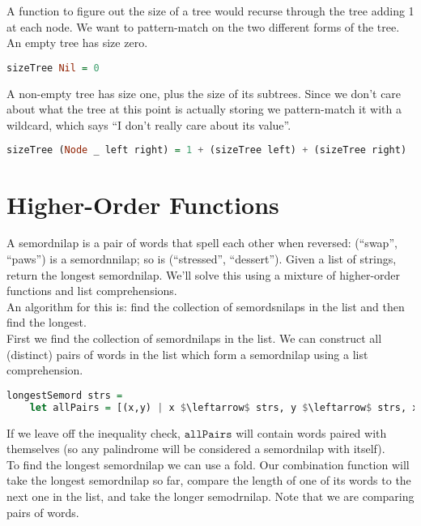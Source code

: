 \documentclass[a4paper,12pt]{article}
\newcommand{\kwa}[1]{\mathtt{#1}}
\begin{document}
\noindent
A function to figure out the size of a tree would recurse through the tree adding 1 at each node. We want to pattern-match on the two different forms of the tree. An empty tree has size zero.

\begin{lstlisting}[language=Haskell]
sizeTree Nil = 0
\end{lstlisting}

\noindent
A non-empty tree has size one, plus the size of its subtrees. Since we don't care about what the tree at this point is actually storing we pattern-match it with a wildcard, which says ``I don't really care about its value''.

\begin{lstlisting}[language=Haskell]
 sizeTree (Node _ left right) = 1 + (sizeTree left) + (sizeTree right)
\end{lstlisting}

\section{Higher-Order Functions}

\noindent
A semordnilap is a pair of words that spell each other when reversed: (``swap'', ``paws'') is a semordnnilap; so is (``stressed'', ``dessert'').  Given a list of strings, return the longest semordnilap. We'll solve this using a mixture of higher-order functions and list comprehensions.\\

\noindent
An algorithm for this is: find the collection of semordsnilaps in the list and then find the longest. \\

\noindent
First we find the collection of semordnilaps in the list. We can construct all (distinct) pairs of words in the list which form a semordnilap using a list comprehension.

\begin{lstlisting}[language=Haskell]
longestSemord strs =
	let allPairs = [(x,y) | x $\leftarrow$ strs, y $\leftarrow$ strs, x /= y, reverse x == y]
\end{lstlisting}

\noindent
If we leave off the inequality check, $\kwa{allPairs}$ will contain words paired with themselves (so any palindrome will be considered a semordnilap with itself). \\

\noindent
To find the longest semordnilap we can use a fold. Our combination function will take the longest semordnilap so far, compare the length of one of its words to the next one in the list, and take the longer semodrnilap. Note that we are comparing pairs of words. \\
\end{document}
